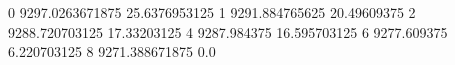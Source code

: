 0 9297.0263671875 25.6376953125
1 9291.884765625 20.49609375
2 9288.720703125 17.33203125
4 9287.984375 16.595703125
6 9277.609375 6.220703125
8 9271.388671875 0.0
